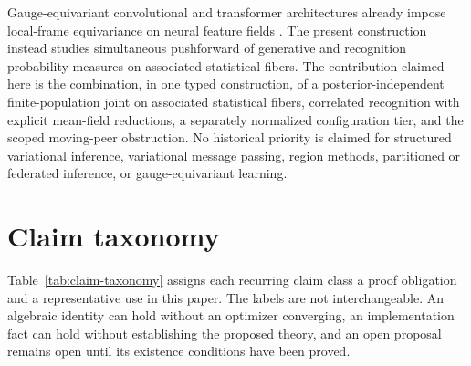 Gauge-equivariant convolutional and transformer architectures already impose local-frame equivariance on neural feature fields \citep{cohen2019gauge,He2021GaugeEquivariantTransformer,Bronstein2021,weiler2021coordinate}. The present construction instead studies simultaneous pushforward of generative and recognition probability measures on associated statistical fibers. The contribution claimed here is the combination, in one typed construction, of a posterior-independent finite-population joint on associated statistical fibers, correlated recognition with explicit mean-field reductions, a separately normalized configuration tier, and the scoped moving-peer obstruction. No historical priority is claimed for structured variational inference, variational message passing, region methods, partitioned or federated inference, or gauge-equivariant learning.

\section{Claim taxonomy}

Table~\ref{tab:claim-taxonomy} assigns each recurring claim class a proof obligation and a representative use in this paper. The labels are not interchangeable. An algebraic identity can hold without an optimizer converging, an implementation fact can hold without establishing the proposed theory, and an open proposal remains open until its existence conditions have been proved.

